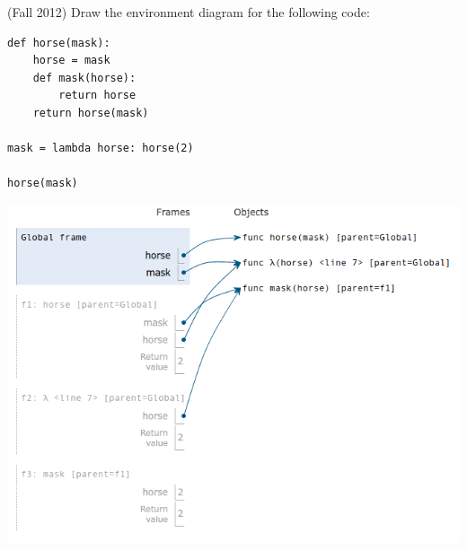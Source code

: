 \question (Fall 2012) Draw the environment diagram for the following code:
\begin{lstlisting}
def horse(mask):
    horse = mask
    def mask(horse):
        return horse
    return horse(mask)

mask = lambda horse: horse(2)

horse(mask)
\end{lstlisting}

\begin{solution}[6in]
\begin{center}
\includegraphics[scale=.5]{horse-mask.png}
\end{center}
\end{solution}
